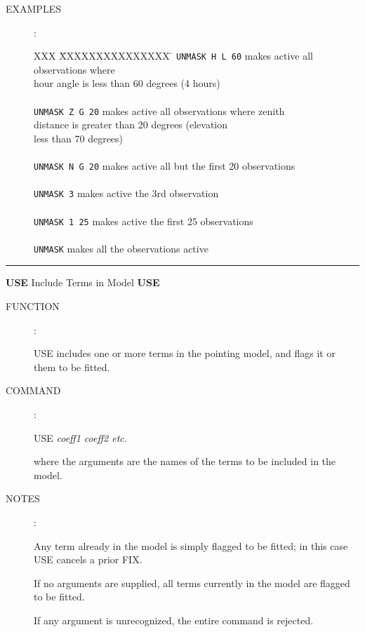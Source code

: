 \begin{description}
\item [EXAMPLES]:
\begin{tabbing}
XXX \= XXXXXXXXXXXXXXX \= \kill
\> {\tt UNMASK H L 60} \> makes active all observations where \\
\>                     \> hour angle is less than 60 degrees (4 hours) \\ \\
\> {\tt UNMASK Z G 20} \> makes active all observations where zenith \\
\>                     \> distance is greater than 20 degrees (elevation \\
\>                     \> less than 70 degrees) \\ \\
\> {\tt UNMASK N G 20} \> makes active all but the first 20 observations \\ \\
\> {\tt UNMASK 3}      \> makes active the 3rd observation \\ \\
\> {\tt UNMASK 1 25}   \> makes active the first 25 observations \\ \\
\> {\tt UNMASK}        \> makes all the observations active
\end{tabbing}

\end{description}


\goodbreak
\rule{\textwidth}{0.3mm}
{\Large {\bf USE} \hfill Include Terms in Model \hfill {\bf USE}}
\begin{description}
\item [FUNCTION]:

USE includes one or more terms in the
pointing model, and flags it or them to be fitted.

\item [COMMAND]:

\begin{cmd}
\> \> USE {\it coeff1 coeff2 etc.}
\end{cmd}

where the arguments are the names of the terms to be
included in the model.

\item [NOTES]:

Any term already in the model is simply flagged to
be fitted; in this case USE cancels a prior FIX.

If no arguments are supplied, all terms currently in
the model are flagged to be fitted.

If any argument is unrecognized, the entire command is rejected.

\end{description}

